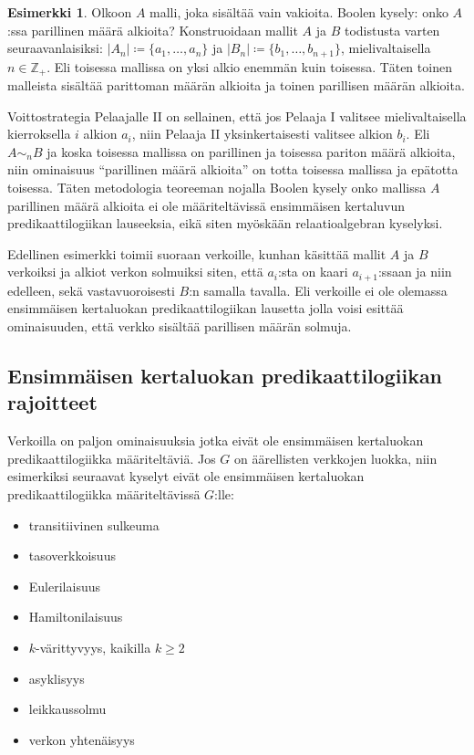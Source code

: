 \documentclass[finnish]{tktltiki2}
\theoremstyle{definition}
\newtheorem{esim}[lau]{Esimerkki}
\theoremstyle{remark}
\begin{document}
\begin{esim}
Olkoon $A$ malli, joka sisältää vain vakioita. Boolen kysely: onko $A$:ssa parillinen määrä alkioita? Konstruoidaan mallit $A$ ja $B$ todistusta varten seuraavanlaisiksi: $|A_n| \coloneqq \{a_1, \ldots, a_n\}$ ja $|B_n| \coloneqq \{b_1, \ldots, b_{n + 1}\}$, mielivaltaisella $n \in \mathbb{Z}_+$. Eli toisessa mallissa on yksi alkio enemmän kuin toisessa. Täten toinen malleista sisältää parittoman määrän alkioita ja toinen parillisen määrän alkioita.

Voittostrategia Pelaajalle II on sellainen, että jos Pelaaja I valitsee mielivaltaisella kierroksella $i$ alkion $a_i$, niin Pelaaja II yksinkertaisesti valitsee alkion $b_i$. Eli $A \sim_n B$ ja koska toisessa mallissa on parillinen ja toisessa pariton määrä alkioita, niin ominaisuus ``parillinen määrä alkioita'' on totta toisessa mallissa ja epätotta toisessa. Täten metodologia teoreeman nojalla Boolen kysely onko mallissa $A$ parillinen määrä alkioita ei ole määriteltävissä ensimmäisen kertaluvun predikaattilogiikan lauseeksia, eikä siten myöskään relaatioalgebran kyselyksi.
\end{esim}

Edellinen esimerkki toimii suoraan verkoille, kunhan käsittää mallit $A$ ja $B$ verkoiksi ja alkiot verkon solmuiksi siten, että $a_i$:sta on kaari $a_{i + 1}$:ssaan ja niin edelleen, sekä vastavuoroisesti $B$:n samalla tavalla. Eli verkoille ei ole olemassa ensimmäisen kertaluokan predikaattilogiikan lausetta jolla voisi esittää ominaisuuden, että verkko sisältää parillisen määrän solmuja.

\subsection{Ensimmäisen kertaluokan predikaattilogiikan rajoitteet}
Verkoilla on paljon ominaisuuksia jotka eivät ole ensimmäisen kertaluokan predikaattilogiikka määriteltäviä. Jos $G$ on äärellisten verkkojen luokka, niin esimerkiksi seuraavat kyselyt eivät ole ensimmäisen kertaluokan predikaattilogiikka määriteltävissä $G$:lle:

\begin{itemize}
\item transitiivinen sulkeuma
\item tasoverkkoisuus
\item Eulerilaisuus
\item Hamiltonilaisuus
\item $k$-värittyvyys, kaikilla $ k \geq 2$
\item asyklisyys
\item leikkaussolmu
\item verkon yhtenäisyys
\end{itemize}
\end{document}
